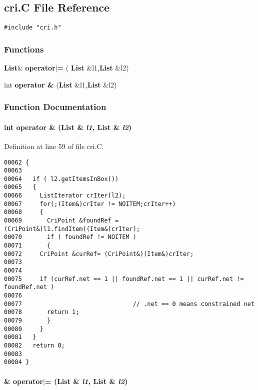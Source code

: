 \subsection{cri.C File Reference}
\label{cri.C}
{\tt \#include "cri.h"}\par
\subsubsection*{Functions}
\begin{CompactItemize}
\item 
{\bf List}\& {\bf operator$|$=} ( {\bf List} \&l1,{\bf List} \&l2)
\item 
int {\bf operator \&} ({\bf List} \&l1,{\bf List} \&l2)
\end{CompactItemize}


\subsubsection{Function Documentation}
\label{cri.C_a1}
\paragraph{\setlength{\rightskip}{0pt plus 5cm}int operator \& ({\bf List} \& {\em l1}, {\bf List} \& {\em l2})}\hfill



Definition at line 59 of file cri.C.\small\begin{verbatim}00062 {
00063 
00064   if ( l2.getItemsInBox())
00065   {  
00066     ListIterator crIter(l2);
00067     for(;(Item&)crIter != NOITEM;crIter++)
00068     {
00069       CriPoint &foundRef = (CriPoint&)l1.findItem((Item&)crIter);
00070       if ( foundRef != NOITEM )
00071       {
00072     CriPoint &curRef= (CriPoint&)(Item&)crIter;
00073 
00074 
00075     if (curRef.net == 1 || foundRef.net == 1 || curRef.net != foundRef.net )
00076 
00077                               // .net == 0 means constrained net
00078       return 1;
00079       }
00080     }  
00081   }
00082   return 0;
00083  
00084 }
\end{verbatim}\normalsize 
\label{cri.C_a0}
\paragraph{ \& operator$|$= ({\bf List} \& {\em l1}, {\bf List} \& {\em l2})}\hfill




